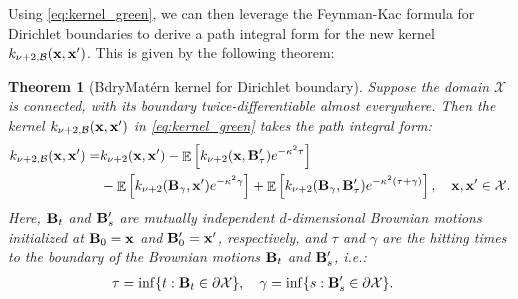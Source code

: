 \documentclass[aos,preprint]{imsart}
\theoremstyle{plain}
\newtheorem{theorem}{Theorem}[section]
\DeclareMathOperator{\E}{\mathbb E}
\newcommand{\CalX}{\mathcal X}
\newcommand{\Bx}{\bold x}
\newcommand{\BFx}{\bold x}
\theoremstyle{remark}
\begin{document}
Using \eqref{eq:kernel_green}, we can then leverage the Feynman-Kac formula for Dirichlet boundaries \citep{ito1957fundamental,stroock1971diffusion,papanicolaou1990probabilistic} to derive a path integral form for the new kernel $k_{\nu+2,\mathcal{B}}(\BFx, \BFx')$. This is given by the following theorem:
\begin{theorem}[BdryMat\'ern kernel for Dirichlet boundary]
\label{thm:bdryMatern_path_integral_dirichlet}
    Suppose the domain $\CalX$ is connected, with its boundary twice-differentiable almost everywhere. Then the kernel $k_{\nu+2,\mathcal{B}}(\BFx,\BFx')$ in \eqref{eq:kernel_green} takes the path integral form:
    \begin{align}
    \begin{split}
        k_{\nu+2,\mathcal{B}}(\BFx,\BFx')
        =  &k_{\nu+2}(\BFx,\BFx')-\E\left[k_{\nu+2}(\BFx,\bold{B}'_{\tau})e^{-\kappa^2\tau}\right]\\
        &-\E\left[k_{\nu+2}(\bold{B}_{\gamma},\BFx')e^{-\kappa^2\gamma}\right]+\E\left[k_{\nu+2}(\bold{B}_{\gamma},\bold{B}'_{\tau})e^{-\kappa^2(\tau+\gamma)}\right], \quad \mathbf{x},\mathbf{x}' \in \mathcal{X}.
        \end{split}
        \label{eq:bdryMatern_path_integral_dirichlet}
    \end{align}
    Here, $\bold{B}_t$ and $\bold{B}_s'$ are mutually independent $d$-dimensional Brownian motions initialized at $\bold{B}_0=\Bx$ and $\bold{B}'_0=\Bx'$, respectively, and $\tau$ and $\gamma$ are the hitting times to the boundary of the Brownian motions $\bold{B}_t$ and $\bold{B}_s'$, i.e.:
    \begin{align*}
        &\tau=\inf\{t:\bold{B}_t\in\partial\CalX\},\quad \gamma=\inf\{s:\bold{B}'_s\in\partial\CalX\}.
    \end{align*}
\end{theorem}


\end{document}
